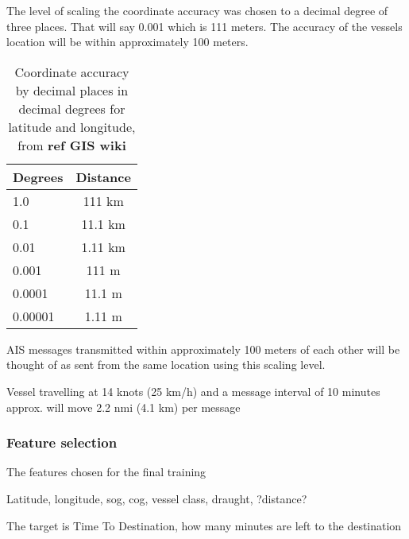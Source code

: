 \documentclass[../main.tex]{subfiles}
\begin{document}
The level of scaling the coordinate accuracy was chosen to a decimal degree of three places. That will say 0.001 which is 111 meters. The accuracy of the vessels location will be within approximately 100 meters.

\begin{table}[H]
\centering
\begin{tabular}{|l|c|}
\hline
\rowcolor[HTML]{9B9B9B} 
\textbf{Degrees} & \multicolumn{1}{l|}{\cellcolor[HTML]{9B9B9B}\textbf{Distance}} \\ \hline
1.0              & 111 km                                                         \\ \hline
\rowcolor[HTML]{EFEFEF} 
0.1              & 11.1 km                                                        \\ \hline
0.01             & 1.11 km                                                        \\ \hline
\rowcolor[HTML]{EFEFEF} 
0.001            & 111 m                                                          \\ \hline
0.0001           & 11.1 m                                                         \\ \hline
\rowcolor[HTML]{EFEFEF} 
0.00001          & 1.11 m                                                         \\ \hline
\end{tabular}
\caption{Coordinate accuracy by decimal places in decimal degrees for latitude and longitude, from \textbf{ref GIS wiki}}
\label{tab:gis-accuracy}
\end{table}

AIS messages transmitted within approximately 100 meters of each other will be thought of as sent from the same location using this scaling level.

Vessel travelling at 14 knots (25 km/h) and a message interval of 10 minutes approx. will move 2.2 nmi (4.1 km) per message



\subsubsection{Feature selection}

The features chosen for the final training 

Latitude, longitude, sog, cog, vessel class, draught, ?distance? 

The target is Time To Destination, how many minutes are left to the destination
\end{document}
